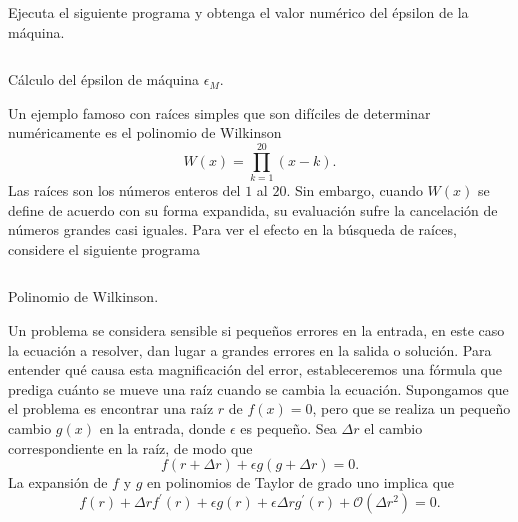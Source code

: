 \begin{questions}

    \question

    Ejecuta el siguiente programa y obtenga el valor numérico del
    épsilon de la máquina.

    \begin{listing}[ht!]
        \tiny
        \centering
        \inputminted[linenos,highlightlines={3-5}]{octave}{epsilonmachine.m}
        \caption{Cálculo del épsilon de máquina $\epsilon_{M}$.}
    \end{listing}

    \question
    Un ejemplo famoso con raíces simples que son difíciles de
    determinar numéricamente es el polinomio de Wilkinson
    \begin{equation*}
        W\left(x\right)=
        \prod_{k=1}^{20}
        \left(x-k\right).
    \end{equation*}
    Las raíces son los números enteros del $1$ al $20$.
    Sin embargo, cuando $W\left(x\right)$ se define de acuerdo con su
    forma expandida, su evaluación sufre la cancelación de números
    grandes casi iguales.
    Para ver el efecto en la búsqueda de raíces, considere el
    siguiente programa
    \begin{listing}[ht!]
        \tiny
        \centering
        \inputminted[linenos,highlightlines={1-13}]{octave}{wilkpoly.m}
        \caption{Polinomio de Wilkinson.}
    \end{listing}
    Un problema se considera sensible si pequeños errores en la
    entrada, en este caso la ecuación a resolver, dan lugar a grandes
    errores en la salida o solución.
    Para entender qué causa esta magnificación del error,
    estableceremos una fórmula que prediga cuánto se mueve una raíz
    cuando se cambia la ecuación.
    Supongamos que el problema es encontrar una raíz $r$ de
    $f\left(x\right)=0$, pero que se realiza un pequeño cambio
    $g\left(x\right)$ en la entrada, donde $\epsilon$ es pequeño.
    Sea $\Delta r$ el cambio correspondiente en la raíz, de modo que
    \begin{equation*}
        f\left(r+\Delta r\right)+\epsilon
        g\left(g+\Delta r\right)=
        0.
    \end{equation*}
    La expansión de $f$ y $g$ en polinomios de Taylor de grado uno
    implica que
    \begin{equation*}
        f\left(r\right)+
        \Delta r
        f^{\prime}\left(r\right)+
        \epsilon
        g\left(r\right)+
        \epsilon
        \Delta r
        g^{\prime}\left(r\right)+
        \mathcal{O}\left(\Delta r^{2}\right)=0.
    \end{equation*}


\end{questions}
